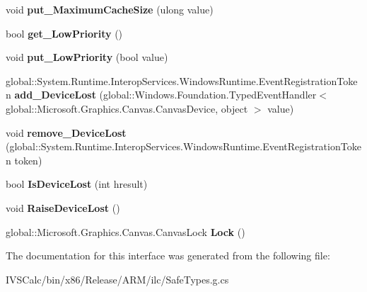 \begin{DoxyCompactItemize}
void {\bfseries put\+\_\+\+Maximum\+Cache\+Size} (ulong value)
\item 
\mbox{\label{interface_microsoft_1_1_graphics_1_1_canvas_1_1_i_canvas_device_a8e974c9c2295757c25f1c270c662d0df}} 
bool {\bfseries get\+\_\+\+Low\+Priority} ()
\item 
\mbox{\label{interface_microsoft_1_1_graphics_1_1_canvas_1_1_i_canvas_device_a82a3e875104020e0b8e886b72df60554}} 
void {\bfseries put\+\_\+\+Low\+Priority} (bool value)
\item 
\mbox{\label{interface_microsoft_1_1_graphics_1_1_canvas_1_1_i_canvas_device_a883498a6511789a253e054e8db8972ac}} 
global\+::\+System.\+Runtime.\+Interop\+Services.\+Windows\+Runtime.\+Event\+Registration\+Token {\bfseries add\+\_\+\+Device\+Lost} (global\+::\+Windows.\+Foundation.\+Typed\+Event\+Handler$<$ global\+::\+Microsoft.\+Graphics.\+Canvas.\+Canvas\+Device, object $>$ value)
\item 
\mbox{\label{interface_microsoft_1_1_graphics_1_1_canvas_1_1_i_canvas_device_a4423eb62fed2e41b1e8429993ad3b1f1}} 
void {\bfseries remove\+\_\+\+Device\+Lost} (global\+::\+System.\+Runtime.\+Interop\+Services.\+Windows\+Runtime.\+Event\+Registration\+Token token)
\item 
\mbox{\label{interface_microsoft_1_1_graphics_1_1_canvas_1_1_i_canvas_device_adb664badebd02d30b2beead4a270a634}} 
bool {\bfseries Is\+Device\+Lost} (int hresult)
\item 
\mbox{\label{interface_microsoft_1_1_graphics_1_1_canvas_1_1_i_canvas_device_a6b74db4223ca531731fcff1891a390d8}} 
void {\bfseries Raise\+Device\+Lost} ()
\item 
\mbox{\label{interface_microsoft_1_1_graphics_1_1_canvas_1_1_i_canvas_device_ac7789f0058908fdfff7cf83b25227a23}} 
global\+::\+Microsoft.\+Graphics.\+Canvas.\+Canvas\+Lock {\bfseries Lock} ()
\end{DoxyCompactItemize}


The documentation for this interface was generated from the following file\+:\begin{DoxyCompactItemize}
\item 
I\+V\+S\+Calc/bin/x86/\+Release/\+A\+R\+M/ilc/Safe\+Types.\+g.\+cs\end{DoxyCompactItemize}
